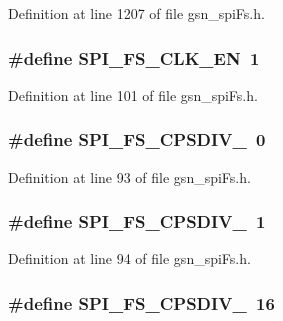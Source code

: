 Definition at line 1207 of file gsn\_\-spiFs.h.

\hypertarget{a00589_a297ad584823afe3301f2f4be272fcfcf}{
\subsubsection[{SPI\_\-FS\_\-CLK\_\-EN}]{\setlength{\rightskip}{0pt plus 5cm}\#define SPI\_\-FS\_\-CLK\_\-EN~1}}
\label{a00589_a297ad584823afe3301f2f4be272fcfcf}


Definition at line 101 of file gsn\_\-spiFs.h.

\hypertarget{a00589_a2c2f57ccb3384cbbd16b7560eabe97e6}{
\subsubsection[{SPI\_\-FS\_\-CPSDIV\_\-0}]{\setlength{\rightskip}{0pt plus 5cm}\#define SPI\_\-FS\_\-CPSDIV\_~0}}
\label{a00589_a2c2f57ccb3384cbbd16b7560eabe97e6}


Definition at line 93 of file gsn\_\-spiFs.h.

\hypertarget{a00589_ad6d79a50da87314c1989cd7f39701ad5}{
\subsubsection[{SPI\_\-FS\_\-CPSDIV\_\-1}]{\setlength{\rightskip}{0pt plus 5cm}\#define SPI\_\-FS\_\-CPSDIV\_~1}}
\label{a00589_ad6d79a50da87314c1989cd7f39701ad5}


Definition at line 94 of file gsn\_\-spiFs.h.

\hypertarget{a00589_a493a9b8d2f1cdfbb226dbeada0c41515}{
\subsubsection[{SPI\_\-FS\_\-CPSDIV\_\-16}]{\setlength{\rightskip}{0pt plus 5cm}\#define SPI\_\-FS\_\-CPSDIV\_~16}}
\label{a00589_a493a9b8d2f1cdfbb226dbeada0c41515}


